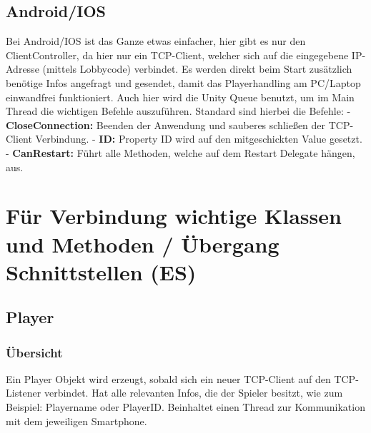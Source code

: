 \subsection{Android/IOS}
Bei Android/IOS ist das Ganze etwas einfacher, hier gibt es nur den ClientController, da hier nur ein TCP-Client, welcher sich auf die eingegebene IP-Adresse (mittels Lobbycode) verbindet. Es werden direkt beim Start zusätzlich benötige Infos angefragt und gesendet, damit das Playerhandling am PC/Laptop einwandfrei funktioniert. Auch hier wird die Unity Queue benutzt, um im Main Thread die wichtigen Befehle auszuführen. Standard sind hierbei die Befehle:
\newline \tab
- \textbf{CloseConnection:} Beenden der Anwendung und sauberes schließen der \newline \tab TCP-Client Verbindung.
\newline \tab
- \textbf{ID:} Property ID wird auf den mitgeschickten Value gesetzt.
\newline \tab 
- \textbf{CanRestart:} Führt alle Methoden, welche auf dem Restart Delegate hängen, \tab aus.
\section{Für Verbindung wichtige Klassen und Methoden / Übergang Schnittstellen (ES)} \label{fvwkum}
\subsection{Player}
\subsubsection{Übersicht}
Ein Player Objekt wird erzeugt, sobald sich ein neuer TCP-Client auf den TCP-Listener verbindet. Hat alle relevanten Infos, die der Spieler besitzt, wie zum Beispiel: Playername oder PlayerID. Beinhaltet einen Thread zur Kommunikation mit dem jeweiligen Smartphone.
